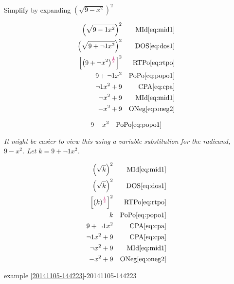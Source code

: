 \documentclass[20150903-160354-rs2.2-MarksMathNotebook.tex]{subfiles}
\begin{document}
\begin{example}[id:20141107-121834] \label{20141107-121834}  \hfill \\

Simplify by expanding $\left(\sqrt{9-x^2}\right)^2$

\soln

\solnsteps
\begin{align*}
\left(\sqrt{9-1x^2}\right)^2 && \text{MId} \eqref{eq:mid1} \\
\left(\sqrt{9+\neg 1x^2}\right)^2 && \text{DOS} \eqref{eq:dos1} \\
\left[\left(9+\neg x^2\right)^{\alert{\frac{1}{2}}} \right]^2 && \text{RTPo} \eqref{eq:rtpo} \\
9+\neg 1 x^2 && \text{PoPo} \eqref{eq:popo1} \\
\neg 1 x^2 + 9 && \text{CPA} \eqref{eq:cpa} \\
\neg x^2 + 9 && \text{MId} \eqref{eq:mid1} \\
-x^2+9 && \text{ONeg} \eqref{eq:oneg2}
\end{align*}

\soln

\lesssteps
\begin{align*}
9-x^2 && \text{PoPo} \eqref{eq:popo1}
\end{align*}


\emph{It might be easier to view this using a variable substitution for the radicand, $9-x^2$. Let $k=9+\neg 1x^2$.}

\begin{align*}
\left(\sqrt{k}\right)^2 && \text{MId} \eqref{eq:mid1} \\
\left(\sqrt{k}\right)^2 && \text{DOS} \eqref{eq:dos1} \\
\left[\left(k\right)^{\alert{\frac{1}{2}}} \right]^2 && \text{RTPo} \eqref{eq:rtpo} \\
k && \text{PoPo} \eqref{eq:popo1} \\
9 + \neg 1 x^2  && \text{CPA} \eqref{eq:cpa} \\
\neg 1 x^2 + 9 && \text{CPA} \eqref{eq:cpa} \\
\neg x^2 + 9 && \text{MId} \eqref{eq:mid1} \\
-x^2+9 && \text{ONeg} \eqref{eq:oneg2}
\end{align*}

\qdepend

\qdependlist
example \ref{20141105-144223}-20141105-144223


\end{example}
\end{document}
